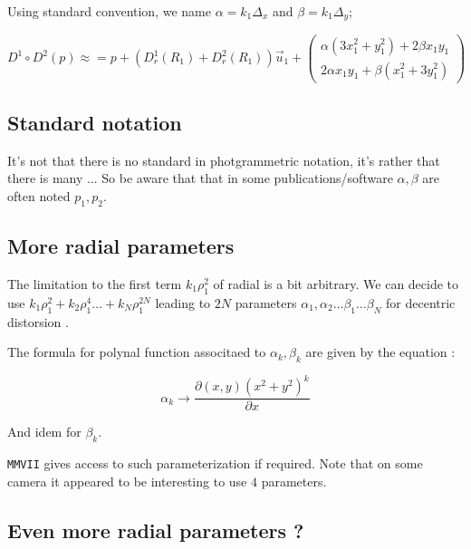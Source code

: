 Using standard convention, we name $\alpha = k_1  \Delta_x $ and $\beta = k_1  \Delta_y$;

\begin{equation}
	D^1 \circ D^2 (p) 
	\approx
	= p +    (D^1_r(R_1) + D^2_r(R_1))  \vec{u}_1  
	  +\begin{pmatrix} \alpha(3 x_1^2 + y_1^2 ) +2\beta x_1 y_1   \\ 2  \alpha x_1 y_1 +  \beta( x_1^2 + 3 y_1^2)  \end{pmatrix}
\end{equation}


\subsection{Standard notation}

It's not that there is no standard in photgrammetric notation, it's rather that there is many ... 
So be aware that   that in some publications/software $\alpha ,  \beta$ are often noted $p_1 ,  p_2$.


\subsection{More radial parameters}

The limitation to  the first term $k_1 \rho_1^2$  of radial is a bit arbitrary. We can decide
to use $k_1 \rho_1^2 + k_2 \rho_1^4 \dots + k_N \rho_1^{2N}$ leading to $2N$
parameters $\alpha_1,\alpha_2 \dots \beta_1 \dots \beta_N$ for decentric
distorsion .

The formula for polynal function associtaed to  $\alpha_k,\beta_k$ are given by the equation :


\begin{equation}
   \alpha_k \rightarrow \frac{\partial (x,y)(x^2+y^2)^k}{\partial x} \label{Eq:Dec:DerKDx}
\end{equation}

And idem for $\beta_k$.

{\tt MMVII} gives access to such parameterization if required. Note that on some 
camera it appeared to be interesting to use $4$ parameters.


\subsection{Even more radial parameters ?}

